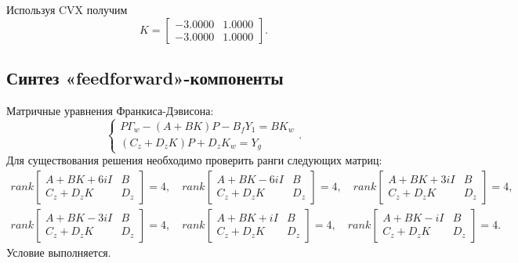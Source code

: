 \noindent Используя CVX получим
\begin{equation*}
    K=\begin{bmatrix}
        -3.0000	&1.0000\\
        -3.0000	&1.0000
    \end{bmatrix}.
\end{equation*}


\subsection{Синтез «feedforward»-компоненты}

Матричные уравнения Франкиса-Дэвисона:
\begin{equation*}
    \begin{cases}
        P\Gamma_w-(A+BK)P-B_fY_1=BK_w\\
        (C_z+D_zK)P+D_zK_w=Y_g
    \end{cases}.
\end{equation*}
Для существования решения необходимо проверить ранги следующих матриц:
\begin{gather*}
    rank\begin{bmatrix}
        A+BK+6iI & B \\
        C_z+D_zK & D_z
    \end{bmatrix}=4,\quad
    rank\begin{bmatrix}
        A+BK-6iI & B \\
        C_z+D_zK & D_z
    \end{bmatrix}=4,\quad
    rank\begin{bmatrix}
        A+BK+3iI & B \\
        C_z+D_zK & D_z
    \end{bmatrix}=4,\quad\\[2ex]
    rank\begin{bmatrix}
        A+BK-3iI & B \\
        C_z+D_zK & D_z
    \end{bmatrix}=4,\quad
    rank\begin{bmatrix}
        A+BK+iI & B \\
        C_z+D_zK & D_z
    \end{bmatrix}=4,\quad
    rank\begin{bmatrix}
        A+BK-iI & B \\
        C_z+D_zK & D_z
    \end{bmatrix}=4.
\end{gather*}
Условие выполняется.
